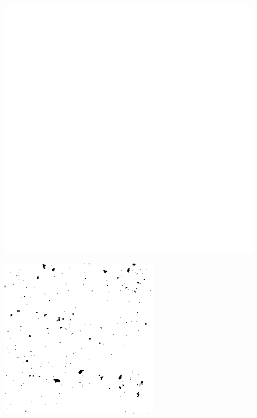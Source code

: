 \begin{figure}[H]
\raggedright
\begin{minipage}[h]{0.245\textwidth}
    \includegraphics[width=1\textwidth]{result/noisy/1.png}
    \label{fig:noise_ref}
\end{minipage}\linebreak
\begin{minipage}[t]{0.245\textwidth}
    \includegraphics[width = \textwidth]{result/noisy/1_5_20.png}

\end{minipage}
\end{figure}
